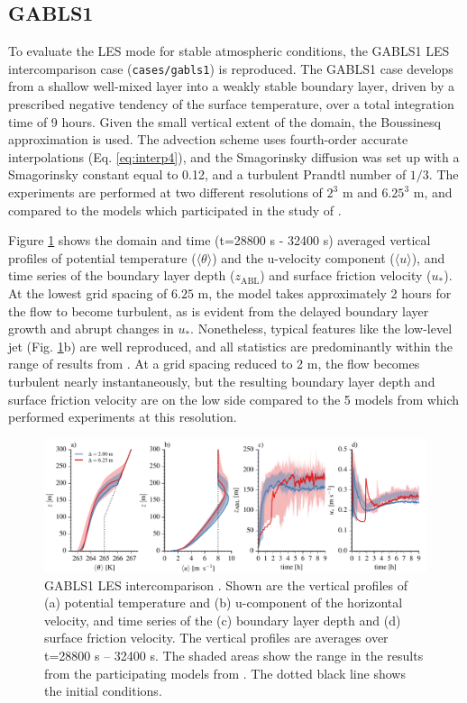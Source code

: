 \documentclass[gmd]{copernicus}
\begin{document}
\subsection{GABLS1}
To evaluate the LES mode for stable atmospheric conditions, the GABLS1 LES intercomparison case \citep{Beare2006} (\texttt{cases/gabls1}) is reproduced. The GABLS1 case develops from a shallow well-mixed layer into a weakly stable boundary layer, driven by a prescribed negative tendency of the surface temperature, over a total integration time of 9 hours. Given the small vertical extent of the domain, the Boussinesq approximation is used. The advection scheme uses fourth-order accurate interpolations (Eq. \ref{eq:interp4}), and the Smagorinsky diffusion was set up with a Smagorinsky constant equal to 0.12, and a turbulent Prandtl number of $1/3$. The experiments are performed at two different resolutions of $2^3$ m and $6.25^3$ m, and compared to the models which participated in the study of \cite{Beare2006}. 

Figure \ref{fig:gabls} shows the domain and time (t=28800 s - 32400 s) averaged vertical profiles of potential temperature ($\langle \theta \rangle$) and the u-velocity component ($\langle u \rangle$), and time series of the boundary layer depth ($z_\mathrm{ABL}$) and surface friction velocity ($u_*$). At the lowest grid spacing of $6.25$ m, the model takes approximately 2 hours for the flow to become turbulent, as is evident from the delayed boundary layer growth and abrupt changes in $u_*$. Nonetheless, typical features like the low-level jet (Fig. \ref{fig:gabls}b) are well reproduced, and all statistics are predominantly within the range of results from \cite{Beare2006}. At a grid spacing reduced to 2 m, the flow becomes turbulent nearly instantaneously, but the resulting boundary layer depth and surface friction velocity are on the low side compared to the 5 models from \cite{Beare2006} which performed experiments at this resolution. 

\begin{figure}[t]
\vspace*{2mm}
\begin{center}
\includegraphics[width=16.6cm]{figs/gmd_gabls_prof_tser.pdf}
\end{center}
\caption{GABLS1 LES intercomparison \citep{Beare2006}. Shown are the vertical profiles of (a) potential temperature and (b) u-component of the horizontal velocity, and time series of the (c) boundary layer depth and (d) surface friction velocity. The vertical profiles are averages over t=28800 s -- 32400 s. The shaded areas show the range in the results from the participating models from  \citep{Beare2006}. The dotted black line shows the initial conditions.}
\label{fig:gabls}
\end{figure}
\end{document}
